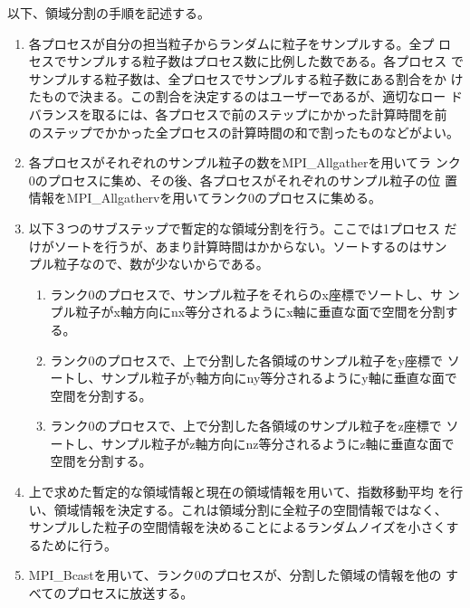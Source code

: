 \documentclass[12pt,a4paper]{jarticle}
\begin{document}
以下、領域分割の手順を記述する。
\begin{enumerate}
\item 各プロセスが自分の担当粒子からランダムに粒子をサンプルする。全プ
  ロセスでサンプルする粒子数はプロセス数に比例した数である。各プロセス
  でサンプルする粒子数は、全プロセスでサンプルする粒子数にある割合をか
  けたもので決まる。この割合を決定するのはユーザーであるが、適切なロー
  ドバランスを取るには、各プロセスで前のステップにかかった計算時間を前
  のステップでかかった全プロセスの計算時間の和で割ったものなどがよい。
\item 各プロセスがそれぞれのサンプル粒子の数をMPI\_Allgatherを用いてラ
  ンク0のプロセスに集め、その後、各プロセスがそれぞれのサンプル粒子の位
  置情報をMPI\_Allgathervを用いてランク0のプロセスに集める。
\item 以下３つのサブステップで暫定的な領域分割を行う。ここでは1プロセス
  だけがソートを行うが、あまり計算時間はかからない。ソートするのはサン
  プル粒子なので、数が少ないからである。
  \begin{enumerate}
  \item ランク0のプロセスで、サンプル粒子をそれらのx座標でソートし、サ
    ンプル粒子がx軸方向にnx等分されるようにx軸に垂直な面で空間を分割す
    る。
  \item ランク0のプロセスで、上で分割した各領域のサンプル粒子をy座標で
    ソートし、サンプル粒子がy軸方向にny等分されるようにy軸に垂直な面で
    空間を分割する。
  \item ランク0のプロセスで、上で分割した各領域のサンプル粒子をz座標で
    ソートし、サンプル粒子がz軸方向にnz等分されるようにz軸に垂直な面で
    空間を分割する。
  \end{enumerate}
\item 上で求めた暫定的な領域情報と現在の領域情報を用いて、指数移動平均
  を行い、領域情報を決定する。これは領域分割に全粒子の空間情報ではなく、
  サンプルした粒子の空間情報を決めることによるランダムノイズを小さくす
  るために行う。
\item MPI\_Bcastを用いて、ランク0のプロセスが、分割した領域の情報を他の
  すべてのプロセスに放送する。
\end{enumerate}
\end{document}
